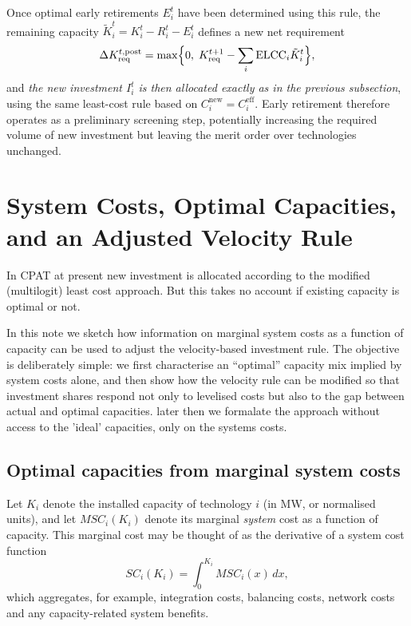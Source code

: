 \documentclass[preprint,authoryear,12pt]{elsarticle}
\begin{document}
Once optimal early retirements $E_i^t$ have been determined using this
rule, the remaining capacity
\(
\tilde{K}_i^t = K_i^t - R_i^t - E_i^t
\)
defines a new net requirement
\begin{equation}
\Delta K_{\mathrm{req}}^{t,\mathrm{post}}
=
\max\Bigl\{
0,\;
K_{\mathrm{req}}^{t+1}
-
\sum_i \mathrm{ELCC}_i \tilde{K}_i^t
\Bigr\},
\end{equation}
and \emph{the new investment $I_i^t$ is then allocated exactly as in the
previous subsection}, using the same least-cost rule based on
$C_i^{\mathrm{new}} = C_i^{\mathrm{eff}}$. Early retirement therefore
operates as a preliminary screening step, potentially increasing the
required volume of new investment but leaving the merit order over
technologies unchanged.

\newpage



\section{System Costs, Optimal Capacities, and an Adjusted Velocity Rule}

In CPAT at present new investment is allocated according to the modified (multilogit) least cost approach. But this takes no account if existing capacity is optimal or not.

In this note we sketch how information on marginal system costs as a function of capacity can be
used to adjust the velocity-based investment rule. The objective is deliberately simple: we first
characterise an ``optimal'' capacity mix implied by system costs alone, and then show how the
velocity rule can be modified so that investment shares respond not only to levelised costs but
also to the gap between actual and optimal capacities. later then we formalate the approach without access to the 'ideal' capacities, only on the systems costs.

\subsection*{Optimal capacities from marginal system costs}

Let $K_i$ denote the installed capacity of technology $i$ (in MW, or normalised units), and let
$MSC_i(K_i)$ denote its marginal \emph{system} cost as a function of capacity. This marginal cost
may be thought of as the derivative of a system cost function
\[
    SC_i(K_i) = \int_0^{K_i} MSC_i(x)\,dx,
\]
which aggregates, for example, integration costs, balancing costs, network costs and any
capacity-related system benefits.
\end{document}
